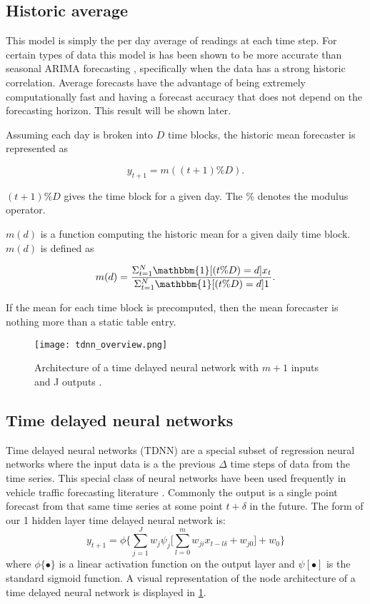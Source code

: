 \subsection{Historic average}
This model is simply the per day average of readings at each time step.  For certain types of data this model is has been shown to be more accurate than seasonal ARIMA forecasting \cite{Newsham2010}, specifically when the data has a strong historic correlation.  Average forecasts have the advantage of being extremely computationally fast and having a forecast accuracy that does not depend on the forecasting horizon.  This result will be shown later.

Assuming each day is broken into $D$ time blocks, the historic mean forecaster is represented as

\begin{equation}
y_{t + 1} = m((t + 1) \% D).
\end{equation}

$(t + 1) \% D$ gives the time block for a given day.  The $\%$ denotes the modulus operator.

$m(d)$ is a function computing the historic mean for a given daily time block.  $m(d)$ is defined as

\begin{equation}
m(d) = \frac{\Sigma_{t = 1}^{N}\mathbbm{1}{[(t \% D) = d]}x_{t}}{\Sigma_{t = 1}^{N}\mathbbm{1}{[(t \% D) = d]}1}.
\end{equation}

If the mean for each time block is precomputed, then the mean forecaster is nothing more than a static table entry.


\begin{figure}[!]
	\centering
		\texttt{[image: tdnn\_overview.png]}
		\caption{Architecture of a time delayed neural network with $m + 1$ inputs and J outputs \cite{Hansen2003}.}
	\label{fig:tdnnarch}
\end{figure}


\subsection{Time delayed neural networks}

Time delayed neural networks (TDNN) are a special subset of regression neural networks where the input data is a the previous $\Delta$ time steps of data from the time series.  This special class of neural networks have been used frequently in vehicle traffic forecasting literature \cite{Abdulhai1999, Ishak2003}.  Commonly the output is a single point forecast from that same time series at some point $t + \delta$ in the future.   The form of our 1 hidden layer time delayed neural network is:
\begin{equation}
y_{t + 1} = \phi \{ \sum_{j = 1}^{J} w_{j}\psi_{j} \bigg[ \sum_{l = 0}^{m}w_{ji}x_{t - l\delta} + w_{j0} \bigg] + w_0 \}
\end{equation}
\noindent where $\phi\{\bullet\}$ is a linear activation function on the output layer and $\psi[\bullet]$ is the standard sigmoid function.  A visual representation of the node architecture of a time delayed neural network is displayed in \ref{fig:tdnnarch}.


